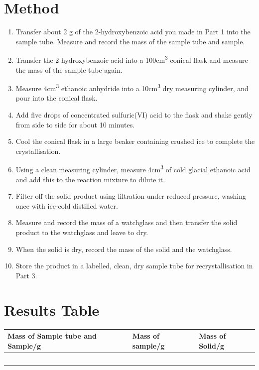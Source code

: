 \section{Method}
\begin{enumerate}
    \item Transfer about 2 g of the 2-hydroxybenzoic acid you made in Part 1 into the sample tube. Measure and record the mass of the sample tube and sample.
    \item Transfer the 2-hydroxybenzoic acid into a 100\si{\centi\meter\cubed} conical flask and measure the mass of the sample tube again. 
    \item Measure 4\si{\centi\meter\cubed} ethanoic anhydride into a 10\si{\centi\meter\cubed} dry measuring cylinder, and pour into the conical flask.
    \item Add five drops of concentrated sulfuric(VI) acid to the flask and shake gently from side to side for about 10 minutes.
    \item Cool the conical flask in a large beaker containing crushed ice to complete the crystallisation.
    \item Using a clean measuring cylinder, measure 4\si{\centi\meter\cubed} of cold glacial ethanoic acid and add this to the reaction mixture to dilute it.
    \item Filter off the solid product using filtration under reduced pressure, washing once with ice-cold distilled water.
    \item Measure and record the mass of a watchglass and then transfer the solid product to the watchglass and leave to dry.
    \item When the solid is dry, record the mass of the solid and the watchglass.
    \item Store the product in a labelled, clean, dry sample tube for recrystallisation in Part 3. 
\end{enumerate}

\section{Results Table}
\begin{center}
\begin{tabularx}{0.8\textwidth} { 
  | >{\raggedright\arraybackslash}X
  | >{\raggedright\arraybackslash}X
  | >{\raggedright\arraybackslash}X | }
 \hline
 Mass of Sample tube and Sample/g & Mass of sample/g & Mass of Solid/g \\
 \hline
 ㅤ&ㅤ&ㅤ& \\
 \hline
\end{tabularx}
\end{center}
\newpage
